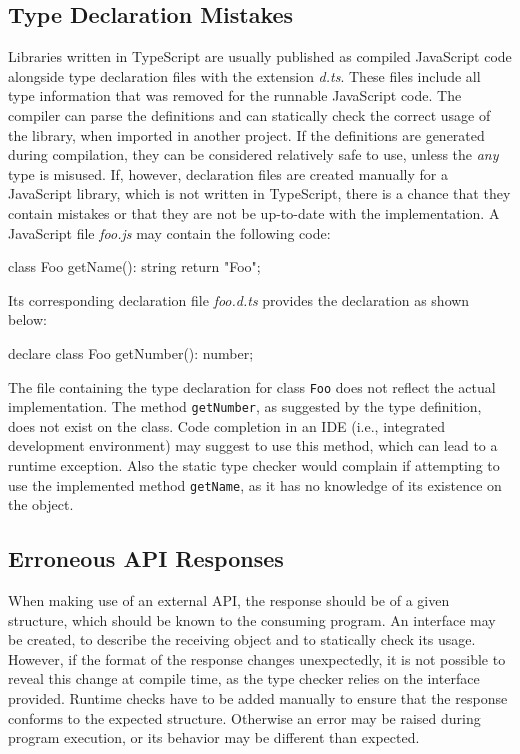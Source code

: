 \subsection{Type Declaration Mistakes}

Libraries written in TypeScript are usually published as compiled JavaScript code alongside type declaration files with the extension \emph{d.ts}. These files include all type information that was removed for the runnable JavaScript code. The compiler can parse the definitions and can statically check the correct usage of the library, when imported in another project. If the definitions are generated during compilation, they can be considered relatively safe to use, unless the \emph{any} type is misused. If, however, declaration files are created manually for a JavaScript library, which is not written in TypeScript, there is a chance that they contain mistakes or that they are not be up-to-date with the implementation. A JavaScript file \emph{foo.js} may contain the following code:
\begin{JsCode}[numbers=none]
class Foo {
  getName(): string {
    return "Foo";
  }
}
\end{JsCode}
Its corresponding declaration file \emph{foo.d.ts} provides the declaration as shown below:
\begin{JsCode}[numbers=none]
declare class Foo {
  getNumber(): number;
}
\end{JsCode}
The file containing the type declaration for class \texttt{Foo} does not reflect the actual implementation. The method \texttt{getNumber}, as suggested by the type definition, does not exist on the class. Code completion in an IDE (i.e., integrated development environment) may suggest to use this method, which can lead to a runtime exception. Also the static type checker would complain if attempting to use the implemented method \texttt{getName}, as it has no knowledge of its existence on the object.

\subsection{Erroneous API Responses}

When making use of an external API, the response should be of a given structure, which should be known to the consuming program. An interface may be created, to describe the receiving object and to statically check its usage. However, if the format of the response changes unexpectedly, it is not possible to reveal this change at compile time, as the type checker relies on the interface provided. Runtime checks have to be added manually to ensure that the response conforms to the expected structure. Otherwise an error may be raised during program execution, or its behavior may be different than expected.

